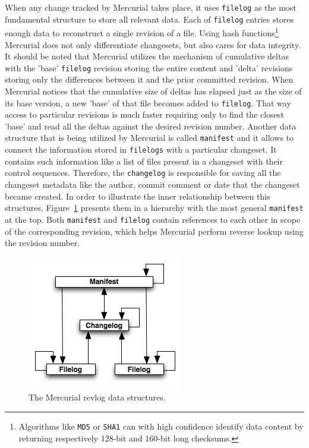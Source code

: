 When any change tracked by Mercurial takes place, it uses \texttt{filelog} as the most fundamental structure to store all relevant data. Each of \texttt{filelog} entries stores enough data to reconstruct a single revision of a file. Using hash functions\footnote{Algorithms like \texttt{MD5} or \texttt{SHA1} can with high confidence identify data content by returning respectively 128-bit and 160-bit long checksums.} Mercurial does not only differentiate changesets, but also cares for data integrity. It should be noted that Mercurial utilizes the mechanism of cumulative deltas with the 'base' \texttt{filelog} revision storing the entire content and 'delta' revisions storing only the differences between it and the prior committed revision. When Mercurial notices that the cumulative size of deltas has elapsed just as the size of its base version, a new 'base' of that file becomes added to \texttt{filelog}. That way access to particular revisions is much faster requiring only to find the closest 'base' and read all the deltas against the desired revision number. Another data structure that is being utilized by Mercurial is called \texttt{manifest} and it allows to connect the information stored in \texttt{filelogs} with a particular changeset. It contains such information like a list of files present in a changeset with their control sequences. Therefore, the \texttt{changelog} is responsible for saving all the changeset metadata like the author, commit comment or date that the changeset became created. In order to illustrate the inner relationship between this structures, Figure~\ref{fig:hg_revlog} presents them in a hierarchy with the most general \texttt{manifest} at the top. Both \texttt{manifest} and \texttt{filelog} contain references to each other in scope of the corresponding revision, which helps Mercurial perform reverse lookup using the revision number.
\begin{figure}[ht]
\begin{center}
\includegraphics[scale=0.6]{charts/hg_revlog.png}
\caption{The Mercurial revlog data structures.}
\label{fig:hg_revlog}
\end{center}
\end{figure}
